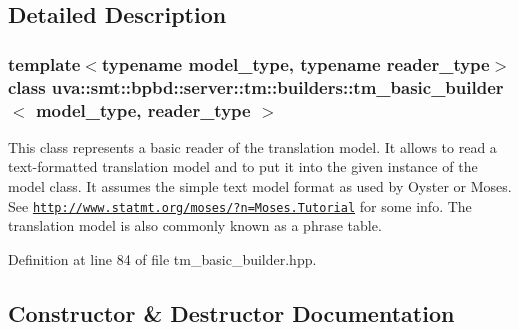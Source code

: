 \subsection{Detailed Description}
\subsubsection*{template$<$typename model\+\_\+type, typename reader\+\_\+type$>$class uva\+::smt\+::bpbd\+::server\+::tm\+::builders\+::tm\+\_\+basic\+\_\+builder$<$ model\+\_\+type, reader\+\_\+type $>$}

This class represents a basic reader of the translation model. It allows to read a text-\/formatted translation model and to put it into the given instance of the model class. It assumes the simple text model format as used by Oyster or Moses. See \href{http://www.statmt.org/moses/?n=Moses.Tutorial}{\tt http\+://www.\+statmt.\+org/moses/?n=\+Moses.\+Tutorial} for some info. The translation model is also commonly known as a phrase table. 

Definition at line 84 of file tm\+\_\+basic\+\_\+builder.\+hpp.



\subsection{Constructor \& Destructor Documentation}
\hypertarget{classuva_1_1smt_1_1bpbd_1_1server_1_1tm_1_1builders_1_1tm__basic__builder_a3acde5a466b7d9e97e4cf7ffdc72dd87}{}
